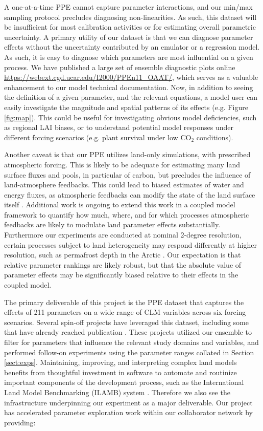 \documentclass[draft]{agujournal2019}
\begin{document}
A one-at-a-time PPE cannot capture parameter interactions, and our min/max sampling protocol precludes diagnosing non-linearities. As such, this dataset will be insufficient for most calibration activities or for estimating overall parametric uncertainty. A primary utility of our dataset is that we can diagnose parameter effects without the uncertainty contributed by an emulator or a regression model. As such, it is easy to diagnose which parameters are most influential on a given process. We have published a large set of ensemble diagnostic plots online \url{https://webext.cgd.ucar.edu/I2000/PPEn11_OAAT/}\add{)}, which serves as a valuable enhancement to our model technical documentation. Now, in addition to seeing the definition of a given parameter, and the relevant equations, a model user can easily investigate the magnitude and spatial patterns of its effects (e.g. Figure \ref{fig:map}). This could be useful for investigating obvious model deficiencies, such as regional LAI biases, or to understand potential model responses under different forcing scenarios (e.g. plant survival under low CO$_2$ conditions).  

Another caveat is that our PPE utilizes land-only simulations, with prescribed atmospheric forcing. This is likely to be adequate for estimating many land surface fluxes and pools, in particular of carbon, but precludes the influence of land-atmosphere feedbacks. This could lead to biased estimates of water and energy fluxes, as atmospheric feedbacks can modify the state of the land surface itself \cite{lague2019}. Additional work is ongoing to extend this work in a coupled model framework to quantify how much, where, and for which processes atmospheric feedbacks are likely to modulate land parameter effects substantially. 
Furthermore our experiments are conducted at nominal 2-degree resolution, certain processes subject to land heterogeneity may respond differently at higher resolution, such as permafrost depth in the Arctic \cite{schickhoff2024}.
Our expectation is that relative parameter rankings are likely robust, but that the absolute value of parameter effects may be significantly biased relative to their effects in the coupled model. 

The primary deliverable of this project is the PPE dataset that captures the effects of 211 parameters on a wide range of CLM variables across six forcing scenarios. Several spin-off projects have leveraged this dataset, including some that have already reached publication \cite{cheng2023,yan2023a,yan2023b}. These projects utilized our ensemble to filter for parameters that influence the relevant study domains and variables, and performed follow-on experiments using the parameter ranges collated in Section \ref{sect:exps}. 
Maintaining, improving, and interpreting complex land models benefits from thoughtful investment in software to automate and routinize important components of the development process, such as the International Land Model Benchmarking (ILAMB) system \cite{collier2018}.
Therefore we also see the infrastructure underpinning our experiment as a major deliverable. Our project has accelerated parameter exploration work within our collaborator network by providing:
\end{document}
